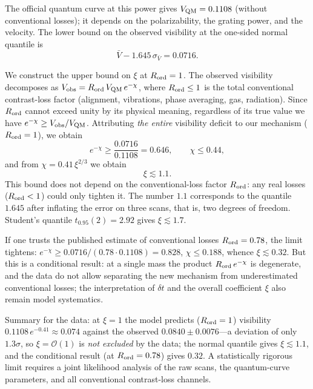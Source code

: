 \documentclass[11pt,a4paper]{article}
\begin{document}
The official quantum curve at this power gives $V_{\rm QM}=0.1108$ (without conventional losses); it depends on the polarizability, the grating power, and the velocity. The lower bound on the observed visibility at the one-sided normal quantile is
\begin{equation}
\bar V-1.645\,\sigma_{\bar V}=0.0716.
\end{equation}

We construct the upper bound on $\xi$ at $R_{\rm ord}=1$. The observed visibility decomposes as $V_{\rm obs}=R_{\rm ord}\,V_{\rm QM}\,e^{-\chi}$, where $R_{\rm ord}\le1$ is the total conventional contrast-loss factor (alignment, vibrations, phase averaging, gas, radiation). Since $R_{\rm ord}$ cannot exceed unity by its physical meaning, regardless of its true value we have $e^{-\chi}\ge V_{\rm obs}/V_{\rm QM}$. Attributing \emph{the entire} visibility deficit to our mechanism ($R_{\rm ord}=1$), we obtain
\begin{equation}
e^{-\chi}\ge\frac{0.0716}{0.1108}=0.646,
\qquad
\chi\le0.44,
\end{equation}
and from $\chi=0.41\,\xi^{2/3}$ we obtain
\begin{equation}
\boxed{\;\xi\lesssim 1.1.\;}
\end{equation}
This bound does not depend on the conventional-loss factor $R_{\rm ord}$: any real losses ($R_{\rm ord}<1$) could only tighten it. The number $1.1$ corresponds to the quantile $1.645$ after inflating the error on three scans, that is, two degrees of freedom. Student's quantile $t_{0.95}(2)=2.92$ gives $\xi\lesssim1.7$.

If one trusts the published estimate of conventional losses $R_{\rm ord}=0.78$, the limit tightens: $e^{-\chi}\ge0.0716/(0.78\cdot0.1108)=0.828$, $\chi\le0.188$, whence $\xi\lesssim0.32$. But this is a conditional result: at a single mass the product $R_{\rm ord}\,e^{-\chi}$ is degenerate, and the data do not allow separating the new mechanism from underestimated conventional losses; the interpretation of $\delta t$ and the overall coefficient $\xi$ also remain model systematics.

Summary for the data: at $\xi=1$ the model predicts ($R_{\rm ord}=1$) visibility $0.1108\,e^{-0.41}\approx0.074$ against the observed $0.0840\pm0.0076$---a deviation of only $1.3\sigma$, so $\xi=\mathcal O(1)$ is \emph{not excluded} by the data; the normal quantile gives $\xi\lesssim1.1$, and the conditional result (at $R_{\rm ord}=0.78$) gives $0.32$. A statistically rigorous limit requires a joint likelihood analysis of the raw scans, the quantum-curve parameters, and all conventional contrast-loss channels.
\end{document}
